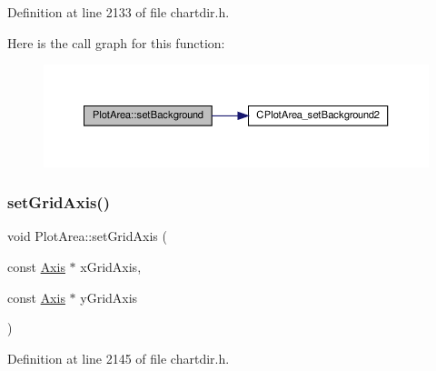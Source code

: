Definition at line 2133 of file chartdir.\+h.

Here is the call graph for this function\+:
\nopagebreak
\begin{figure}[H]
\begin{center}
\leavevmode
\includegraphics[width=350pt]{class_plot_area_abcd924d1be7c5a3f4267f2cbbf14deaa_cgraph}
\end{center}
\end{figure}
\mbox{\label{class_plot_area_a4331047ed4ae116093d50c0a69e6bd91}} 
\subsubsection{\texorpdfstring{set\+Grid\+Axis()}{setGridAxis()}}
{\footnotesize\ttfamily void Plot\+Area\+::set\+Grid\+Axis (\begin{DoxyParamCaption}\item[{const \hyperlink{class_axis}{Axis} $\ast$}]{x\+Grid\+Axis,  }\item[{const \hyperlink{class_axis}{Axis} $\ast$}]{y\+Grid\+Axis }\end{DoxyParamCaption})\hspace{0.3cm}{\ttfamily [inline]}}



Definition at line 2145 of file chartdir.\+h.

